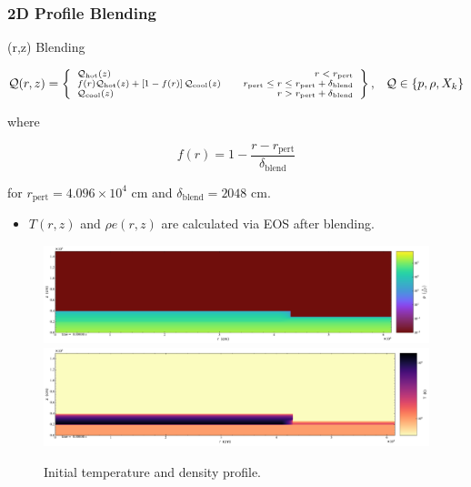 \documentclass[
	11pt, %
]{beamer}
\begin{document}
\begin{frame}[allowframebreaks]
\frametitle{2D Profile Blending}

\begin{block}{(r,z) Blending}
        
    \begin{equation}
        \scriptsize \mathcal{Q}(r, z) = \left\{\begin{array}{lr}
                 \mathcal{Q}_{\mathrm{hot}}(z)  & \quad r < r_{\mathrm{pert}} \\
                
            f(r)\mathcal{Q}_{\mathrm{hot}}(z) + \left[1 - f(r)\right]\mathcal{Q}_{\mathrm{cool}}(z) & \quad r_{\mathrm{pert}} \leq r \leq r_{\mathrm{pert}} + \delta_{\mathrm{blend}}\\
                
            \mathcal{Q}_{\mathrm{cool}}(z)  & \quad r > r_{\mathrm{pert}} + \delta_{\mathrm{blend}}
                \end{array}\right\}, \quad\mathcal{Q} \in \{p, \rho, X_k\}
    \end{equation}

    where
        
    \begin{equation}
        f(r) = 1 - \frac{r - r_{\mathrm{pert}}}{\delta_{\mathrm{blend}}}
    \end{equation}
    
    for $r_{\mathrm{pert}} = 4.096 \times 10^4$ cm and $\delta_{\mathrm{blend}} = 2048$ cm.
\end{block}
    \begin{itemize}
        \item   $T(r,z)$ and $\rho e(r,z)$ are calculated via EOS after blending.
    \end{itemize}

    \begin{figure}
        \centering
        \includegraphics[width=1\linewidth]{init_rho.pdf}
        \includegraphics[width=1\linewidth]{init_temp.pdf}
        \caption{Initial temperature and density profile.}
    \end{figure}

\end{frame}
\end{document}
